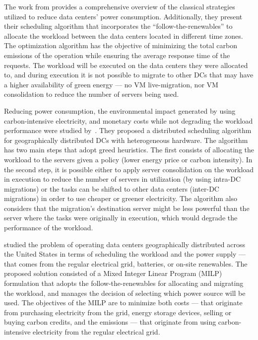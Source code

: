 The work from \citet{XU2020191} provides a comprehensive overview of the classical strategies utilized to reduce data centers' power consumption. Additionally, they present their scheduling algorithm that incorporates the ``follow-the-renewables'' to allocate the workload between the data centers located in different time zones. The optimization algorithm has the objective of minimizing the total carbon emissions of the operation while ensuring the average response time of the requests. The workload will be executed on the data centers they were allocated to, and during execution it is not possible to migrate to other DCs that may have a higher availability of green energy --- no VM live-migration, nor VM consolidation to reduce the number of servers being used.


Reducing power consumption, the environmental impact generated by using carbon-intensive electricity, and monetary costs while not degrading the workload performance were studied by~\citet{ALI2021110907}. They proposed a distributed scheduling algorithm for geographically distributed DCs with heterogeneous hardware. The algorithm has two main steps that adopt greed heuristics. The first consists of allocating the workload to the servers given a policy (lower energy price or carbon intensity). In the second step, it is possible either to apply server consolidation on the workload in execution to reduce the number of servers in utilization (by using intra-DC migrations) or the tasks can be shifted to other data centers (inter-DC migrations) in order to use cheaper or greener electricity. The algorithm also considers that the migration's destination server might be less powerful than the server where the tasks were originally in execution, which would degrade the performance of the workload.


\citet{RUIZDUARTE2023_operation_dcs_renewables} studied the problem of operating data centers geographically distributed across the United States in terms of scheduling the workload and the power supply --- that comes from the regular electrical grid, batteries, or on-site renewables. The proposed solution consisted of a Mixed Integer Linear Program (MILP) formulation that adopts the follow-the-renewables for allocating and migrating the workload, and manages the decision of selecting which power source will be used. The objectives of the MILP are to minimize both costs --- that originate from purchasing electricity from the grid, energy storage devices, selling or buying carbon credits, and the  emissions  --- that originate from using carbon-intensive electricity from the regular electrical grid.



